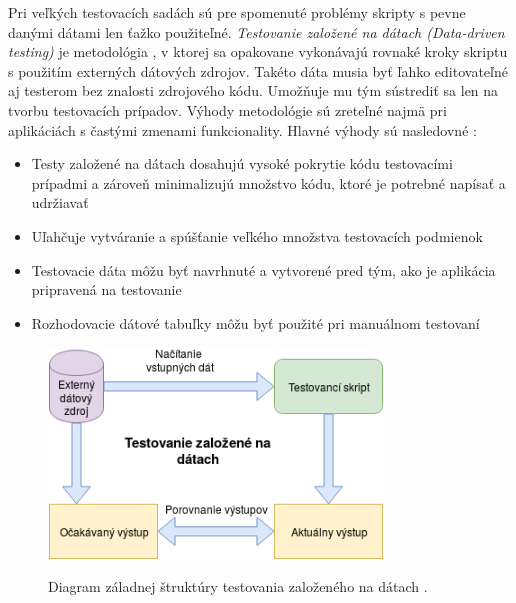 Pri veľkých testovacích sadách sú pre spomenuté problémy skripty s pevne danými dátami len ťažko použiteľné. {\it Testovanie založené na dátach (Data-driven testing)} je metodológia , v ktorej sa opakovane vykonávajú rovnaké kroky skriptu s použitím externých dátových zdrojov. Takéto dáta musia byť ľahko editovateľné aj testerom bez znalosti zdrojového kódu. Umožňuje mu tým sústrediť sa len na tvorbu testovacích prípadov. Výhody metodológie sú zreteľné najmä pri aplikáciách s častými zmenami funkcionality. Hlavné výhody sú nasledovné \cite{Sttc}:
\begin{itemize}
	\item{Testy založené na dátach dosahujú vysoké pokrytie kódu testovacími prípadmi a zároveň minimalizujú množstvo kódu, ktoré je potrebné napísať a udržiavať}
	\item{Uľahčuje vytváranie a spúšťanie veľkého množstva testovacích podmienok}
	\item{Testovacie dáta môžu byť navrhnuté a vytvorené pred tým, ako je aplikácia pripravená na testovanie}
	\item{Rozhodovacie dátové tabuľky môžu byť použité pri manuálnom testovaní}
\end{itemize}
\begin{figure}[h]\centering
	\centering
	\includegraphics[width=3.5in,height=2.2in]{obrazky-figures/Data-driven_testing.png}\\[1pt]
	\caption{Diagram záladnej štruktúry testovania založeného na dátach .}
	\label{Tdd_img}
\end{figure}
